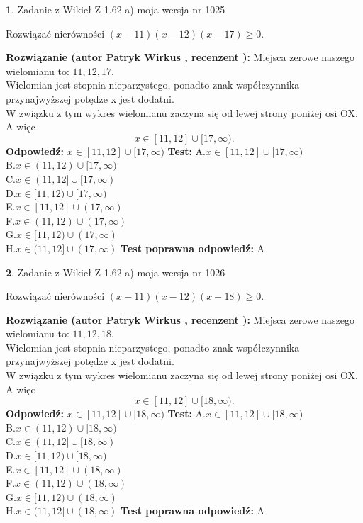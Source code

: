 \documentclass[12pt, a4paper]{article}
\theoremstyle{definition} %
\newtheorem{zad}{}
\newcommand{\zadStart}[1]{\begin{zad}#1\newline}
\newcommand{\zadStop}{\end{zad}}
\newcommand{\rozwStart}[2]{\noindent \textbf{Rozwiązanie (autor #1 , recenzent #2): }\newline}
\newcommand{\rozwStop}{\newline}
\newcommand{\odpStart}{\noindent \textbf{Odpowiedź:}\newline}
\newcommand{\odpStop}{\newline}
\newcommand{\testStart}{\noindent \textbf{Test:}\newline}
\newcommand{\testStop}{\newline}
\newcommand{\kluczStart}{\noindent \textbf{Test poprawna odpowiedź:}\newline}
\newcommand{\kluczStop}{\newline}
\begin{document}
\zadStart{Zadanie z Wikieł Z 1.62 a) moja wersja nr 1025}

Rozwiązać nierówności $(x-11)(x-12)(x-17)\ge0$.
\zadStop
\rozwStart{Patryk Wirkus}{}
Miejsca zerowe naszego wielomianu to: $11, 12, 17$.\\
Wielomian jest stopnia nieparzystego, ponadto znak współczynnika przy\linebreak najwyższej potędze x jest dodatni.\\ W związku z tym wykres wielomianu zaczyna się od lewej strony poniżej osi OX. A więc $$x \in [11,12] \cup [17,\infty).$$
\rozwStop
\odpStart
$x \in [11,12] \cup [17,\infty)$
\odpStop
\testStart
A.$x \in [11,12] \cup [17,\infty)$\\
B.$x \in (11,12) \cup [17,\infty)$\\
C.$x \in (11,12] \cup [17,\infty)$\\
D.$x \in [11,12) \cup [17,\infty)$\\
E.$x \in [11,12] \cup (17,\infty)$\\
F.$x \in (11,12) \cup (17,\infty)$\\
G.$x \in [11,12) \cup (17,\infty)$\\
H.$x \in (11,12] \cup (17,\infty)$
\testStop
\kluczStart
A
\kluczStop



\zadStart{Zadanie z Wikieł Z 1.62 a) moja wersja nr 1026}

Rozwiązać nierówności $(x-11)(x-12)(x-18)\ge0$.
\zadStop
\rozwStart{Patryk Wirkus}{}
Miejsca zerowe naszego wielomianu to: $11, 12, 18$.\\
Wielomian jest stopnia nieparzystego, ponadto znak współczynnika przy\linebreak najwyższej potędze x jest dodatni.\\ W związku z tym wykres wielomianu zaczyna się od lewej strony poniżej osi OX. A więc $$x \in [11,12] \cup [18,\infty).$$
\rozwStop
\odpStart
$x \in [11,12] \cup [18,\infty)$
\odpStop
\testStart
A.$x \in [11,12] \cup [18,\infty)$\\
B.$x \in (11,12) \cup [18,\infty)$\\
C.$x \in (11,12] \cup [18,\infty)$\\
D.$x \in [11,12) \cup [18,\infty)$\\
E.$x \in [11,12] \cup (18,\infty)$\\
F.$x \in (11,12) \cup (18,\infty)$\\
G.$x \in [11,12) \cup (18,\infty)$\\
H.$x \in (11,12] \cup (18,\infty)$
\testStop
\kluczStart
A
\kluczStop
\end{document}
